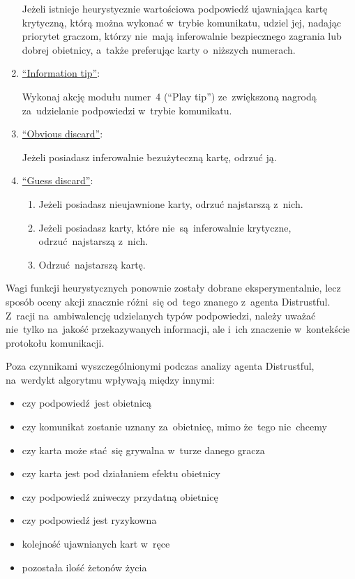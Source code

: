 \documentclass[declaration,shortabstract,inz]{iithesis}
\begin{document}
\begin{enumerate}
	Jeżeli istnieje heurystycznie wartościowa podpowiedź ujawniająca kartę krytyczną, którą można wykonać w~trybie komunikatu, udziel jej, nadając priorytet graczom, którzy nie~mają inferowalnie bezpiecznego zagrania lub dobrej obietnicy, a~także preferując karty o~niższych numerach.
	
	\item \underline{``Information tip''}:
	
	Wykonaj akcję modułu numer~4 (``Play tip'') ze~zwiększoną nagrodą za~udzielanie podpowiedzi w~trybie komunikatu.
	
	\item \underline{``Obvious discard''}:
	
	Jeżeli posiadasz inferowalnie bezużyteczną kartę, odrzuć ją.

	\item \underline{``Guess discard''}:
	\begin{enumerate}
		\item Jeżeli posiadasz nieujawnione karty, odrzuć najstarszą z~nich.
		\item Jeżeli posiadasz karty, które nie~są~inferowalnie krytyczne, odrzuć najstarszą z~nich.
		\item Odrzuć najstarszą kartę.
	\end{enumerate}

\end{enumerate}

Wagi funkcji heurystycznych ponownie zostały dobrane eksperymentalnie, lecz sposób oceny akcji znacznie różni~się od~tego znanego z~agenta Distrustful. Z~racji na~ambiwalencję udzielanych typów podpowiedzi, należy uważać nie~tylko na~jakość przekazywanych informacji, ale i~ich znaczenie w~kontekście protokołu komunikacji.

Poza czynnikami wyszczególnionymi podczas analizy agenta Distrustful, na~werdykt algorytmu wpływają między innymi:

\begin{itemize}
	\item czy podpowiedź jest obietnicą
	\item czy komunikat zostanie uznany za~obietnicę, mimo że~tego nie~chcemy
	\item czy karta może stać~się grywalna w~turze danego gracza
	\item czy karta jest pod działaniem efektu obietnicy
	\item czy podpowiedź zniweczy przydatną obietnicę
	\item czy podpowiedź jest ryzykowna
	\item kolejność ujawnianych kart w~ręce
	\item pozostała ilość żetonów życia
\end{itemize}
\end{document}
